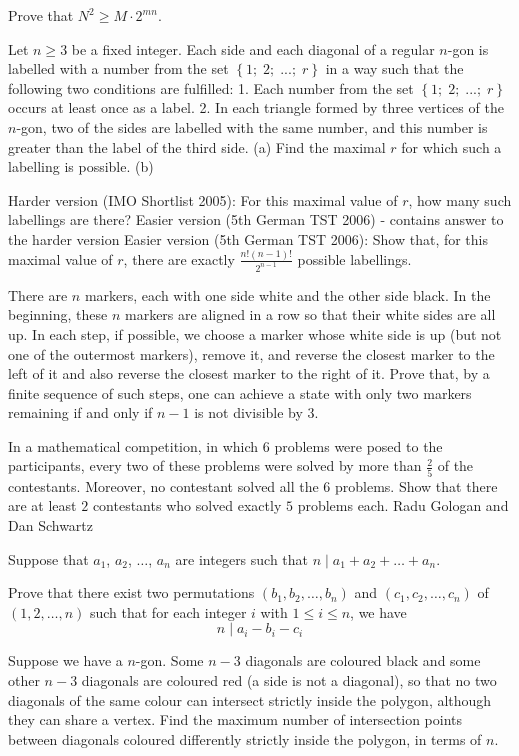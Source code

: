 Prove that 
$N^{2}\geq M\cdot 2^{mn}$.

\item[\textbf{C4.}]
Let 
$n\geq 3$
 be a fixed integer. Each side and each diagonal of a regular 
$n$-gon is labelled with a number from the set 
$\left\{1;\;2;\;...;\;r\right\}$
 in a way such that the following two conditions are fulfilled:
1.
 Each number from the set 
$\left\{1;\;2;\;...;\;r\right\}$
 occurs at least once as a label.
2.
 In each triangle formed by three vertices of the 
$n$-gon, two of the sides are labelled with the same number, and this number is greater than the label of the third side.
(a)
 Find the maximal 
$r$
 for which such a labelling is possible.
(b)
 
Harder version (IMO Shortlist 2005):
 For this maximal value of 
$r$, 
 how many such labellings are there?
Easier version (5th German TST 2006) - contains answer to the harder version
Easier version (5th German TST 2006):
 Show that, for this maximal value of 
$r$, 
 there are exactly 
$\frac{n!\left(n-1\right)!}{2^{n-1}}$
 possible labellings.

\item[\textbf{C5.}]
There are 
$ n$
 markers, each with one side white and the other side black. In the beginning, these 
$ n$
 markers are aligned in a row so that their white sides are all up. In each step, if possible, we choose a marker whose white side is up (but not one of the outermost markers), remove it, and reverse the closest marker to the left of it and also reverse the closest marker to the right of it. Prove that, by a finite sequence of such steps, one can achieve a state with only two markers remaining if and only if 
$ n - 1$
 is not divisible by 
$ 3$.

\item[\textbf{C6.}]
In a mathematical competition, in which 
$6$
 problems were posed to the participants, every two of these problems were solved by more than 
$\frac 25$
 of the contestants. Moreover, no contestant solved all the 
$6$
 problems. Show that there are at least 
$2$
 contestants who solved exactly 
$5$
 problems each.
Radu Gologan and Dan Schwartz

\item[\textbf{C7.}]
Suppose that 
$ a_1$, 
$ a_2$, 
$ \ldots$, 
$ a_n$
 are integers such that 
$ n\mid a_1 + a_2 + \ldots + a_n$.

Prove that there exist two permutations 
$ \left(b_1,b_2,\ldots,b_n\right)$
 and 
$ \left(c_1,c_2,\ldots,c_n\right)$
 of 
$ \left(1,2,\ldots,n\right)$
 such that for each integer 
$ i$
 with 
$ 1\leq i\leq n$, 
 we have
\[ n\mid a_i - b_i - c_i
\]

\item[\textbf{C8.}]
Suppose we have a 
$n$-gon. Some 
$n-3$
 diagonals are coloured black and some other 
$n-3$
 diagonals are coloured red (a side is not a diagonal), so that no two diagonals of the same colour can intersect strictly inside the polygon, although they can share a vertex. Find the maximum number of intersection points between diagonals coloured differently strictly inside the polygon, in terms of 
$n$.

